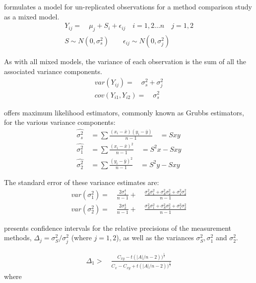 \documentclass[12pt, a4paper]{report}
\theoremstyle{plain}
\theoremstyle{definition}
\theoremstyle{remark}
\begin{document}
	\citet{Kinsella} formulates a model for un-replicated observations
	for a method comparison study as a mixed model.
	\begin{eqnarray}
	Y_{ij} =\quad \mu_{j} + S_{i} + \epsilon_{ij} \quad i=1,2...n\quad
	j=1,2\\
	S \sim N(0,\sigma^{2}_{s})\qquad \epsilon_{ij} \sim
	N(0,\sigma^{2}_{j}) \nonumber
	\end{eqnarray}
	
	As with all mixed models, the variance of each observation is the
	sum of all the associated variance components.
	\begin{eqnarray}
	var(Y_{ij}) =\quad \sigma^{2}_{s} + \sigma^{2}_{j} \\
	cov(Y_{i1},Y_{i2})=\quad \sigma^{2}_{s} \nonumber
	\end{eqnarray}
	
	\citet{Grubbs48} offers maximum likelihood estimators, commonly
	known as Grubbs estimators, for the various variance components:
	\begin{eqnarray}
	\hat{\sigma^{2}_{s}} \quad= \sum{\frac{(x_{i}-\bar{x})(y_{i}-\bar{y})}{n-1}}\quad=Sxy\\
	\hat{\sigma^{2}_{1}} \quad= \sum{\frac{(x_{i}-\bar{x})^{2}}{n-1}} \quad=S^{2}x-Sxy \nonumber\\
	\hat{\sigma^{2}_{2}} \quad=
	\sum{\frac{(y_{i}-\bar{y})^{2}}{n-1}}\quad=S^{2}y-Sxy \nonumber
	\nonumber
	\end{eqnarray}
	
	The standard error of these variance estimates are:
	\begin{eqnarray}
	var(\sigma^{2}_{1}) =\quad \frac{2\sigma^{4}_{1}}{n-1} +\quad
	\frac{\sigma^2_{S}\sigma^2_{1}+\sigma^2_{S}\sigma^2_{2}+\sigma^2_{1}\sigma^2_{2}
	}{n-1}\\
	var(\sigma^{2}_{2}) =\quad \frac{2\sigma^{4}_{2}}{n-1} +\quad
	\frac{\sigma^2_{S}\sigma^2_{1}+\sigma^2_{S}\sigma^2_{2}+\sigma^2_{1}\sigma^2_{2}
	}{n-1}\nonumber
	\end{eqnarray}
	
	\citet{Thompson}presents confidence intervals for the relative
	precisions of the measurement methods, $\Delta_{j}=
	\sigma^2_{S}/\sigma^2_{j}$ (where $j=1,2$), as well as the
	variances $\sigma^{2}_{S}, \sigma^{2}_{1}$ and $\sigma^{2}_{2}$.
	
	\begin{eqnarray}
	\Delta_{1} >\quad \frac{C_{xy}-
		t(|A|/n-2))^{\frac{1}{2}}}{C_{x}-C_{xy}+
		t(|A|/n-2))^{\frac{1}{2}}}
	\end{eqnarray}
	where
	
\end{document}
